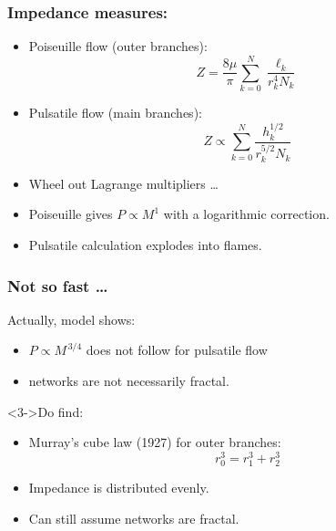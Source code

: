 \begin{frame}
  \frametitle{Impedance measures:}

  \begin{block}{}
    \begin{itemize}
    \item 
      Poiseuille flow (outer branches):
      $$ Z = \frac{8\mu}{\pi} \sum_{k=0}^N \frac{\ell_k}{r_k^4 N_k} $$
    \item 
      Pulsatile flow (main branches):
      $$ Z \propto \sum_{k=0}^N \frac{h_k^{1/2}}{r_k^{5/2} N_k} $$
    \item 
      Wheel out Lagrange multipliers \ldots
    \item 
      Poiseuille gives $P \propto M^1$ with a logarithmic correction.
    \item 
      Pulsatile calculation explodes into flames.
    \end{itemize}
  \end{block}

\end{frame}

\begin{frame}
  \frametitle{Not so fast \ldots}

  \begin{block}{Actually, model shows:}
    \begin{itemize}
    \item<1->
      $P \propto M^{\, 3/4}$ does not follow for pulsatile flow
    \item<2->
      networks are not necessarily fractal.
    \end{itemize}
  \end{block}

  \begin{block}<3->{Do find:}
    \begin{itemize}
    \item<3->
      Murray's cube law (1927) for outer branches:\cite{murray1927a}
      $$r_0^{3} = r_1^{3} + r_2^{3}$$
    \item<4->
      Impedance is distributed evenly.
    \item<5->
      Can still assume networks are fractal.
    \end{itemize}
  \end{block}

\end{frame}


